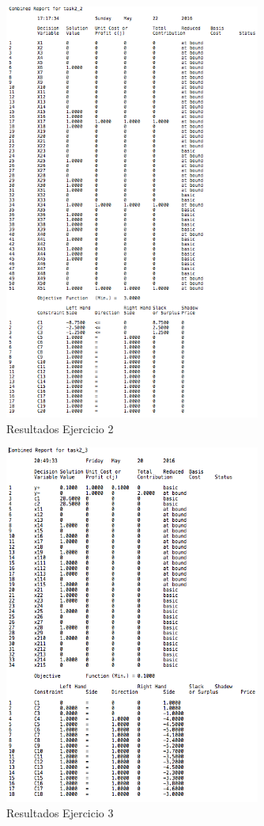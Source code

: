 \documentclass[10pt, a4paper]{article}
\begin{document}
		\begin{figure}[H]
		\centering
			\includegraphics[width=0.75\textwidth]{res/exercise-2-result.png}
			\caption{Resultados Ejercicio 2}
  			\label{fig:ej2}
		\end{figure}

		\begin{figure}[H]
		\centering
			\includegraphics[width=0.75\textwidth]{res/exercise-3-result.png}
			\caption{Resultados Ejercicio 3}
  			\label{fig:ej3}
		\end{figure}
\end{document}
